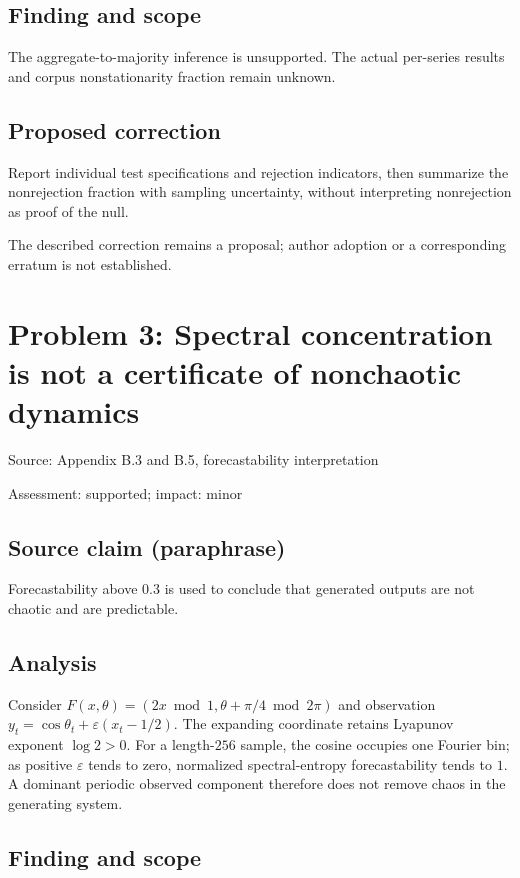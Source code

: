 \documentclass[11pt]{article}
\begin{document}
\subsection*{Finding and scope}

The aggregate-to-majority inference is unsupported. The actual per-series results and corpus nonstationarity fraction remain unknown.

\subsection*{Proposed correction}

Report individual test specifications and rejection indicators, then summarize the nonrejection fraction with sampling uncertainty, without interpreting nonrejection as proof of the null.

The described correction remains a proposal; author adoption or a corresponding erratum is not established.

\section*{Problem 3: Spectral concentration is not a certificate of nonchaotic dynamics}

Source: Appendix B.3 and B.5, forecastability interpretation

Assessment: supported; impact: minor

\subsection*{Source claim (paraphrase)}

Forecastability above \(0.3\) is used to conclude that generated outputs are not chaotic and are predictable.

\subsection*{Analysis}

Consider \(F(x,\theta)=(2x\bmod1,\theta+\pi/4\bmod2\pi)\) and observation \(y_t=\cos\theta_t+\varepsilon(x_t-1/2)\). The expanding coordinate retains Lyapunov exponent \(\log2>0\). For a length-\(256\) sample, the cosine occupies one Fourier bin; as positive \(\varepsilon\) tends to zero, normalized spectral-entropy forecastability tends to \(1\). A dominant periodic observed component therefore does not remove chaos in the generating system.

\subsection*{Finding and scope}
\end{document}
